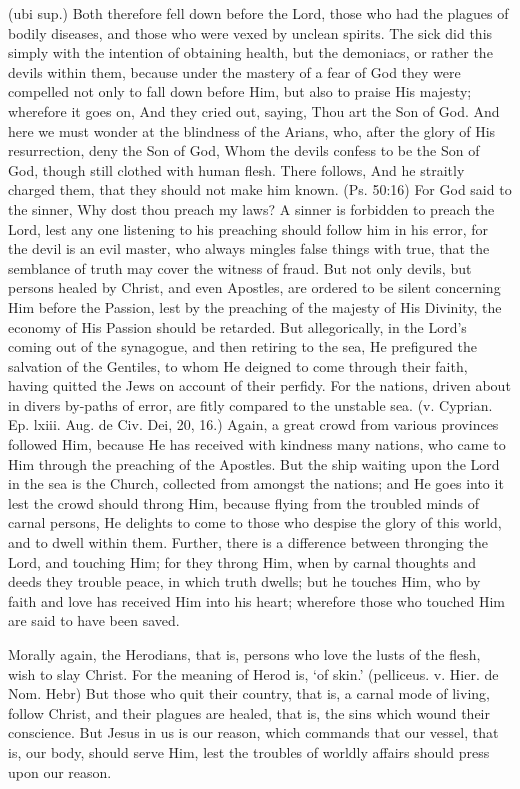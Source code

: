  (ubi sup.) Both therefore fell down before the Lord, those who had the plagues of bodily diseases, and those who were vexed by unclean spirits. The sick did this simply with the intention of obtaining health, but the demoniacs, or rather the devils within them, because under the mastery of a fear of God they were compelled not only to fall down before Him, but also to praise His majesty; wherefore it goes on, And they cried out, saying, Thou art the Son of God. And here we must wonder at the blindness of the Arians, who, after the glory of His resurrection, deny the Son of God, Whom the devils confess to be the Son of God, though still clothed with human flesh. There follows, And he straitly charged them, that they should not make him known. (Ps. 50:16) For God said to the sinner, Why dost thou preach my laws? A sinner is forbidden to preach the Lord, lest any one listening to his preaching should follow him in his error, for the devil is an evil master, who always mingles false things with true, that the semblance of truth may cover the witness of fraud. But not only devils, but persons healed by Christ, and even Apostles, are ordered to be silent concerning Him before the Passion, lest by the preaching of the majesty of His Divinity, the economy of His Passion should be retarded. But allegorically, in the Lord’s coming out of the synagogue, and then retiring to the sea, He prefigured the salvation of the Gentiles, to whom He deigned to come through their faith, having quitted the Jews on account of their perfidy. For the nations, driven about in divers by-paths of error, are fitly compared to the unstable sea. (v. Cyprian. Ep. lxiii. Aug. de Civ. Dei, 20, 16.) Again, a great crowd from various provinces followed Him, because He has received with kindness many nations, who came to Him through the preaching of the Apostles. But the ship waiting upon the Lord in the sea is the Church, collected from amongst the nations; and He goes into it lest the crowd should throng Him, because flying from the troubled minds of carnal persons, He delights to come to those who despise the glory of this world, and to dwell within them. Further, there is a difference between thronging the Lord, and touching Him; for they throng Him, when by carnal thoughts and deeds they trouble peace, in which truth dwells; but he touches Him, who by faith and love has received Him into his heart; wherefore those who touched Him are said to have been saved.

 Morally again, the Herodians, that is, persons who love the lusts of the flesh, wish to slay Christ. For the meaning of Herod is, ‘of skin.’ (pelliceus. v. Hier. de Nom. Hebr) But those who quit their country, that is, a carnal mode of living, follow Christ, and their plagues are healed, that is, the sins which wound their conscience. But Jesus in us is our reason, which commands that our vessel, that is, our body, should serve Him, lest the troubles of worldly affairs should press upon our reason.

